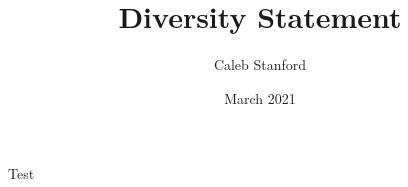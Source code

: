 \documentclass{article}
\title{Diversity Statement}
\author{Caleb Stanford}
\date{March 2021}
\begin{document}
\maketitle{}

Test~\cite{popl19}



\end{document}

